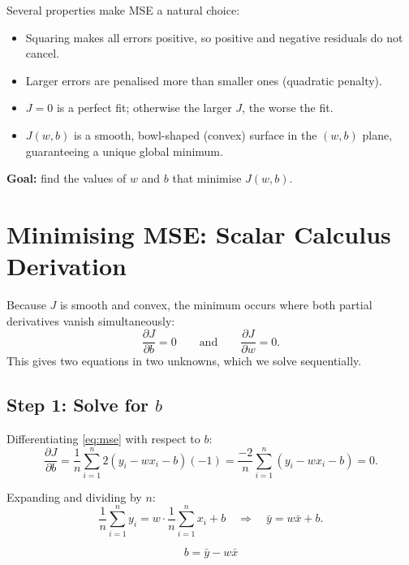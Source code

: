 \documentclass[12pt, a4paper]{article}
\newif\ifstudentmode
\newcommand{\sol}[2][6cm]{%
  \ifstudentmode
    \underline{\hspace{#1}}%
  \else
    {#2}%
  \fi
}
\theoremstyle{definition}
\newcommand{\xbar}{\bar{x}}
\newcommand{\ybar}{\bar{y}}
\begin{document}
Several properties make MSE a natural choice:
\begin{itemize}[nosep]
  \item Squaring makes all errors positive, so positive and negative residuals
        do not cancel.
  \item Larger errors are penalised more than smaller ones (quadratic penalty).
  \item $J = 0$ is a perfect fit; otherwise the larger $J$, the worse the fit.
  \item $J(w,b)$ is a smooth, bowl-shaped (convex) surface in the
        $(w, b)$ plane, guaranteeing a unique global minimum.
\end{itemize}

\textbf{Goal:} find the values of $w$ and $b$ that minimise $J(w,b)$.

\section{Minimising MSE: Scalar Calculus Derivation}

Because $J$ is smooth and convex, the minimum occurs where both partial
derivatives vanish simultaneously:
\[
  \frac{\partial J}{\partial b} = 0
  \qquad \text{and} \qquad
  \frac{\partial J}{\partial w} = 0.
\]
This gives two equations in two unknowns, which we solve sequentially.

\subsection{Step 1: Solve for \texorpdfstring{$b$}{b}}

Differentiating \eqref{eq:mse} with respect to $b$:
\[
  \frac{\partial J}{\partial b}
  = \frac{1}{n}\sum_{i=1}^{n} 2(y_i - wx_i - b)(-1)
  = \frac{-2}{n}\sum_{i=1}^{n}(y_i - wx_i - b) = 0.
\]

Expanding and dividing by $n$:
\[
  \frac{1}{n}\sum_{i=1}^{n} y_i
  = w \cdot \frac{1}{n}\sum_{i=1}^{n} x_i + b
  \quad \Longrightarrow \quad
  \ybar = w\xbar + b.
\]

\begin{resultbox}
\[
  b = \sol[7cm]{\ybar - w\xbar}
\]
\end{resultbox}
\end{document}
